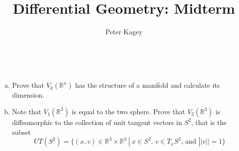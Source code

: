 \documentclass{article}
\newenvironment{problem}[2][Problem]{\begin{trivlist}
\item[\hskip \labelsep {\bfseries #1}\hskip \labelsep {\bfseries #2.}]}{\end{trivlist}}
\begin{document}
\title{Differential Geometry: Midterm}
\author{Peter Kagey}

\maketitle

\begin{problem}{1} \text{} \\
  \begin{enumerate}[(a)]
    \item Prove that $V_k(\mathbb{R}^n)$ has the structure of a manifold and
      calculate its dimension.
    \item Note that $V_1(\mathbb{R}^3)$ is equal to the two sphere.
      Prove that $V_2(\mathbb{R}^3)$ is diffeomorphic to the collection of unit
      tangent vectors in $S^2$, that is the subset \[
        UT(S^2) = \{
          (x, v) \in \mathbb{R}^3 \times \mathbb{R}^3 \ |\
          x \in S^2,\, v \in T_xS^2,\,\text{and } ||v|| = 1
        \}
      \]
  \end{enumerate}
\end{problem}
\end{document}
